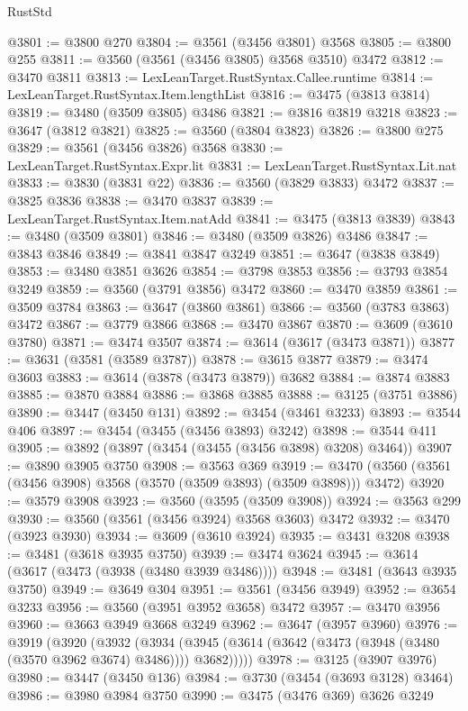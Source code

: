 \begin{lexlean}{RustStd}
\begin{coremodule}
@3801 := @3800 @270
@3804 := @3561 (@3456 @3801) @3568
@3805 := @3800 @255
@3811 := @3560 (@3561 (@3456 @3805) @3568 @3510) @3472
@3812 := @3470 @3811
@3813 := LexLeanTarget.RustSyntax.Callee.runtime
@3814 := LexLeanTarget.RustSyntax.Item.lengthList
@3816 := @3475 (@3813 @3814)
@3819 := @3480 (@3509 @3805) @3486
@3821 := @3816 @3819 @3218
@3823 := @3647 (@3812 @3821)
@3825 := @3560 (@3804 @3823)
@3826 := @3800 @275
@3829 := @3561 (@3456 @3826) @3568
@3830 := LexLeanTarget.RustSyntax.Expr.lit
@3831 := LexLeanTarget.RustSyntax.Lit.nat
@3833 := @3830 (@3831 @22)
@3836 := @3560 (@3829 @3833) @3472
@3837 := @3825 @3836
@3838 := @3470 @3837
@3839 := LexLeanTarget.RustSyntax.Item.natAdd
@3841 := @3475 (@3813 @3839)
@3843 := @3480 (@3509 @3801)
@3846 := @3480 (@3509 @3826) @3486
@3847 := @3843 @3846
@3849 := @3841 @3847 @3249
@3851 := @3647 (@3838 @3849)
@3853 := @3480 @3851 @3626
@3854 := @3798 @3853
@3856 := @3793 @3854 @3249
@3859 := @3560 (@3791 @3856) @3472
@3860 := @3470 @3859
@3861 := @3509 @3784
@3863 := @3647 (@3860 @3861)
@3866 := @3560 (@3783 @3863) @3472
@3867 := @3779 @3866
@3868 := @3470 @3867
@3870 := @3609 (@3610 @3780)
@3871 := @3474 @3507
@3874 := @3614 (@3617 (@3473 @3871))
@3877 := @3631 (@3581 (@3589 @3787))
@3878 := @3615 @3877
@3879 := @3474 @3603
@3883 := @3614 (@3878 (@3473 @3879)) @3682
@3884 := @3874 @3883
@3885 := @3870 @3884
@3886 := @3868 @3885
@3888 := @3125 (@3751 @3886)
@3890 := @3447 (@3450 @131)
@3892 := @3454 (@3461 @3233)
@3893 := @3544 @406
@3897 := @3454 (@3455 (@3456 @3893) @3242)
@3898 := @3544 @411
@3905 := @3892 (@3897 (@3454 (@3455 (@3456 @3898) @3208) @3464))
@3907 := @3890 @3905 @3750
@3908 := @3563 @369
@3919 := @3470 (@3560 (@3561 (@3456 @3908) @3568 (@3570 (@3509 @3893) (@3509 @3898))) @3472)
@3920 := @3579 @3908
@3923 := @3560 (@3595 (@3509 @3908))
@3924 := @3563 @299
@3930 := @3560 (@3561 (@3456 @3924) @3568 @3603) @3472
@3932 := @3470 (@3923 @3930)
@3934 := @3609 (@3610 @3924)
@3935 := @3431 @3208
@3938 := @3481 (@3618 @3935 @3750)
@3939 := @3474 @3624
@3945 := @3614 (@3617 (@3473 (@3938 (@3480 @3939 @3486))))
@3948 := @3481 (@3643 @3935 @3750)
@3949 := @3649 @304
@3951 := @3561 (@3456 @3949)
@3952 := @3654 @3233
@3956 := @3560 (@3951 @3952 @3658) @3472
@3957 := @3470 @3956
@3960 := @3663 @3949 @3668 @3249
@3962 := @3647 (@3957 @3960)
@3976 := @3919
    (@3920
      (@3932
        (@3934 (@3945 (@3614 (@3642 (@3473 (@3948 (@3480 (@3570 @3962 @3674) @3486)))) @3682)))))
@3978 := @3125 (@3907 @3976)
@3980 := @3447 (@3450 @136)
@3984 := @3730 (@3454 (@3693 @3128) @3464)
@3986 := @3980 @3984 @3750
@3990 := @3475 (@3476 @369) @3626 @3249

\end{coremodule}
\end{lexlean}
